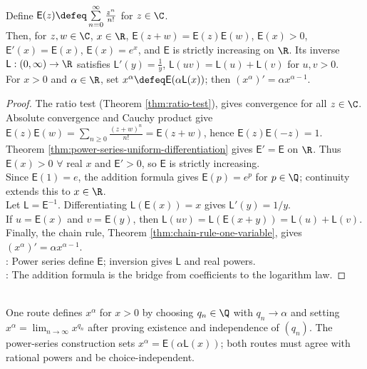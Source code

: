 \begin{theorem} \label{thm:exponential-logarithm-from-power-series} \\
Define $\mathsf{E}(z)\defeq\sum\limits_{n=0}^{\infty}\frac{z^n}{n!}$ for $z\in\C$.\\
Then, for $z,w\in\C$, $x\in\R$, $\mathsf{E}(z+w)=\mathsf{E}(z)\mathsf{E}(w)$, $\mathsf{E}(x)>0$, $\mathsf{E}'(x)=\mathsf{E}(x)$, $\mathsf{E}(x)=e^x$, and $\mathsf{E}$ is strictly increasing on $\R$. Its inverse $\mathsf{L}:(0,\infty)\to\R$ satisfies $\mathsf{L}'(y)=\frac1y$, $\mathsf{L}(uv)=\mathsf{L}(u)+\mathsf{L}(v)$ for $u,v>0$.\\
For $x>0$ and $\alpha\in\R$, set $x^\alpha\defeq \mathsf{E}(\alpha \mathsf{L}(x))$; then $(x^\alpha)'=\alpha x^{\alpha-1}$.
\begin{proof}
The ratio test (Theorem \ref{thm:ratio-test}), gives convergence for all $z\in\C$.\\
Absolute convergence and Cauchy product give $\mathsf{E}(z)\mathsf{E}(w)=\sum\limits_{n\ge0}\frac{(z+w)^n}{n!}=\mathsf{E}(z+w)$, hence $\mathsf{E}(z)\mathsf{E}(-z)=1$.\\
Theorem \ref{thm:power-series-uniform-differentiation} gives $\mathsf{E}'=\mathsf{E}$ on $\R$. Thus $\mathsf{E}(x)>0$ $\forall$ real $x$ and $\mathsf{E}'>0$, so $\mathsf{E}$ is strictly increasing.\\
Since $\mathsf{E}(1)=e$, the addition formula gives $\mathsf{E}(p)=e^p$ for $p\in\Q$; continuity extends this to $x\in\R$.\\
Let $\mathsf{L}=\mathsf{E}^{-1}$. Differentiating $\mathsf{L}(\mathsf{E}(x))=x$ gives $\mathsf{L}'(y)=1/y$.\\
If $u=\mathsf{E}(x)$ and $v=\mathsf{E}(y)$, then $\mathsf{L}(uv)=\mathsf{L}(\mathsf{E}(x+y))=\mathsf{L}(u)+\mathsf{L}(v)$.\\
Finally, the chain rule, Theorem \ref{thm:chain-rule-one-variable}, gives $(x^\alpha)'=\alpha x^{\alpha-1}$.\\
: Power series define $\mathsf{E}$; inversion gives $\mathsf{L}$ and real powers.\\
: The addition formula is the bridge from coefficients to the logarithm law.
\end{proof}
\end{theorem}

\begin{perspective} \label{per:real-powers-rational-approximation-route} \\
One route defines $x^\alpha$ for $x>0$ by choosing $q_n\in\Q$ with $q_n\to\alpha$ and setting $x^\alpha=\lim_{n\to\infty}x^{q_n}$ after proving existence and independence of $(q_n)$. The power-series construction sets $x^\alpha=\mathsf{E}(\alpha\mathsf{L}(x))$; both routes must agree with rational powers and be choice-independent.
\end{perspective}

